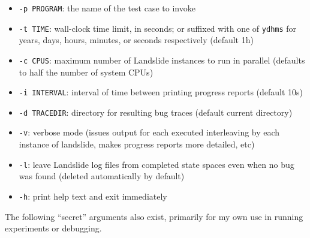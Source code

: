 \begin{itemize}
	\item {\tt -p PROGRAM}: the name of the test case to invoke
	\item {\tt -t TIME}: wall-clock time limit, in seconds; or suffixed with one of {\tt ydhms} for years, days, hours, minutes, or seconds respectively (default 1h)
	\item {\tt -c CPUS}: maximum number of Landslide instances to run in parallel (defaults to half the number of system CPUs)
	\item {\tt -i INTERVAL}: interval of time between printing progress reports (default 10s)
	\item {\tt -d TRACEDIR}: directory for resulting bug traces (default current directory)
	\item {\tt -v}: verbose mode (issues output for each executed interleaving by each instance of landslide, makes progress reports more detailed, etc)
	\item {\tt -l}: leave Landslide log files from completed state spaces even when no bug was found (deleted automatically by default)
	\item {\tt -h}: print help text and exit immediately
\end{itemize}

The following ``secret'' arguments also exist, primarily for my own use in running experiments or debugging.

